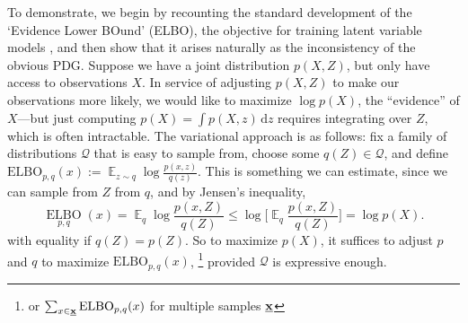 \documentclass[twoside]{article}
\theoremstyle{plain}
\theoremstyle{definition}
\DeclareMathOperator*{\Ex}{\mathbb{E}} %
\newcommand{\thickD}{I\mkern-8muD}
\newcommand{\kldiv}{\thickD\infdivx}
\begin{document}
To demonstrate, we begin by recounting the standard development of the `Evidence Lower BOund' (ELBO), the objective for training latent variable models \cite[\S2.2]{blei2017variational}, and then show that it arises naturally as the inconsistency of the obvious PDG.
Suppose we have a joint distribution $p(X,Z)$, but only have access to observations $X$.
In service of adjusting $p(X,Z)$ to make our observations more likely, we would like to maximize $\log p(X)$, the ``evidence'' of $X$---but just computing $p(X) = \int p(X,z)\, \mathrm d z$ requires integrating over $Z$, which is often intractable.
%
The variational approach is as follows: fix a family of distributions $\mathcal Q$ that is easy to sample from, choose some $q(Z) \in \mathcal Q$, and define
$\mathrm{ELBO}_{p,q}(x) := \Ex_{z \sim q} \log \frac{p(x,z)}{q(z)}$.
This is something we can estimate, since we can sample from $Z$ from $q$, and by Jensen's inequality, 
\[
    \mathop{\mathrm{ELBO}}\limits_{p,q}(x)
    =\! \Ex_{q} \log \frac{p(x,Z)}{q(Z)}
    \le  \log \Big[\! \Ex_{q}\! \frac{p(x,Z)}{q(Z)} \Big]\!
    = \log p(X).
\]
with equality if $q(Z) = p(Z)$. 
So to maximize $p(X)$, it suffices to adjust $p$ and $q$ to maximize $\mathrm{ELBO}_{p,q}(x)$,%
    \footnote{ or $\sum_{x \in {\underline{\mathbf{x}}}}\mathrm{ELBO}_{p,q}(x)$ for multiple samples ${\underline{\mathbf{x}}}$}
 provided $\mathcal Q$ is expressive enough.
    
\end{document}
